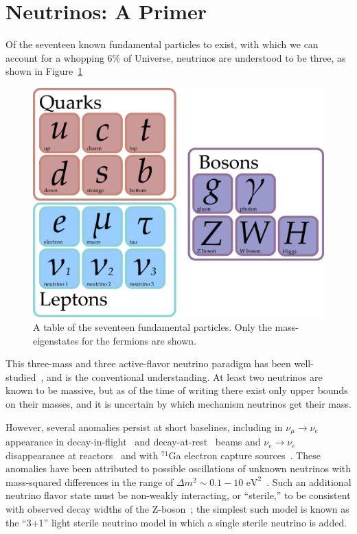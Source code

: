 \documentclass[main.tex]{subfiles}
\begin{document}
\section{Neutrinos: A Primer}
Of the seventeen known fundamental particles to exist, with which we can account for a whopping 6\% of Universe, neutrinos are understood to be three, as shown in Figure~\ref{fig:party}
\begin{figure}
    \centering
    \includegraphics[width=0.8\linewidth]{figures/particles.png}
    \caption{A table of the seventeen fundamental particles. Only the mass-eigenstates for the fermions are shown.}\label{fig:party}
\end{figure}
This three-mass and three active-flavor neutrino  paradigm has been well-studied~\cite{PhysRevD.98.030001,Esteban_2019,de_Salas_2018,Capozzi_2016,zboson2006, berns2021recent}, and is the conventional understanding.
At least two neutrinos are known to be massive, but as of the time of writing there exist only upper bounds on their masses, and it is uncertain by which mechanism neutrinos get their mass.

However, several anomalies persist at short baselines, including in $\nu_\mu\rightarrow\nu_e $ appearance in decay-in-flight~\cite{aguilar2018significant} and decay-at-rest~\cite{Athanassopoulos_1998} beams  and $\nu_e\rightarrow\nu_e$ disappearance at reactors~\cite{mention2011reactor,serebrov2019first}  and with $^{71}$Ga electron capture sources~\cite{PhysRevC.73.045805,giunti2011statistical}.  
These anomalies have been attributed to possible oscillations of unknown neutrinos with mass-squared differences in the range of $\Delta m^{2}\sim 0.1-10\text{ eV}^{2}$~\cite{abazajian2012light}.   
Such an additional neutrino flavor state must be non-weakly interacting, or ``sterile,'' to be consistent with observed decay widths of the Z-boson~\cite{zboson2006}; the simplest such model is known as the ``3+1'' light sterile neutrino model in which a single sterile neutrino is added. 
\end{document}
